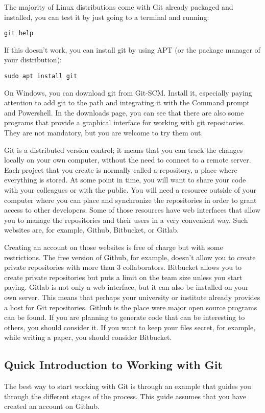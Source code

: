 The majority of Linux distributions come with Git already packaged and installed, you can test it by just going to a terminal and running:
\begin{verbatim}
git help
\end{verbatim}
If this doesn’t work, you can install git by using APT (or the package manager of your distribution):
\begin{verbatim}
sudo apt install git
\end{verbatim}

On Windows, you can download git from Git-SCM. Install it, especially paying attention to add git to the path and integrating it with the Command prompt and Powershell. In the downloads page, you can see that there are also some programs that provide a graphical interface for working with git repositories. They are not mandatory, but you are welcome to try them out.

Git is a distributed version control; it means that you can track the changes locally on your own computer, without the need to connect to a remote server. Each project that you create is normally called a repository, a place where everything is stored. At some point in time, you will want to share your code with your colleagues or with the public. You will need a resource outside of your computer where you can place and synchronize the repositories in order to grant access to other developers. Some of those resources have web interfaces that allow you to manage the repositories and their users in a very convenient way. Such websites are, for example, Github, Bitbucket, or Gitlab.

Creating an account on those websites is free of charge but with some restrictions. The free version of Github, for example, doesn’t allow you to create private repositories with more than 3 collaborators. Bitbucket allows you to create private repositories but puts a limit on the team size unless you start paying. Gitlab is not only a web interface, but it can also be installed on your own server. This means that perhaps your university or institute already provides a host for Git repositories. Github is the place were major open source programs can be found. If you are planning to generate code that can be interesting to others, you should consider it. If you want to keep your files secret, for example, while writing a paper, you should consider Bitbucket.

\subsection{Quick Introduction to Working with Git}
The best way to start working with Git is through an example that guides you through the different stages of the process. This guide assumes that you have created an account on Github.

